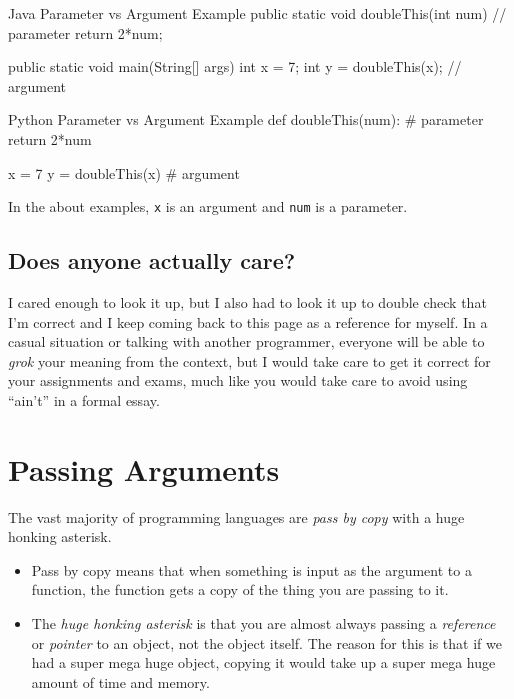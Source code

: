 \begin{javacode}{Java Parameter vs Argument Example}
public static void doubleThis(int num) {   // parameter
	return 2*num;
}

public static void main(String[] args){
	int x = 7;
	int y = doubleThis(x);  // argument
}

\end{javacode}

\begin{pycode}{Python Parameter vs Argument Example}
def doubleThis(num): # parameter
	return 2*num
		
x = 7
y = doubleThis(x) # argument
\end{pycode}

In the about examples, \texttt{x} is an argument and \texttt{num} is a parameter.


\subsection{Does anyone actually care?}

I cared enough to look it up, but I also had to look it up to double check that I'm correct and I keep coming back to this page as a reference for myself.  
In a casual situation or talking with another programmer, everyone will be able to \textit{grok} your meaning from the context, but I would take care to get it correct for your assignments and exams, much like you would take care to avoid using ``ain't'' in a formal essay.

\section{Passing Arguments}

The vast majority of programming languages are \textit{pass by copy} with a huge honking asterisk.
\begin{itemize}
	\item Pass by copy means that when something is input as the argument to a function, the function gets a copy of the thing you are passing to it.
	\item The \textit{huge honking asterisk} is that you are almost always passing a \textit{reference} or \textit{pointer} to an object, not the object itself.  The reason for this is that if we had a super mega huge object, copying it would take up a super mega huge amount of time and memory.
\end{itemize}



